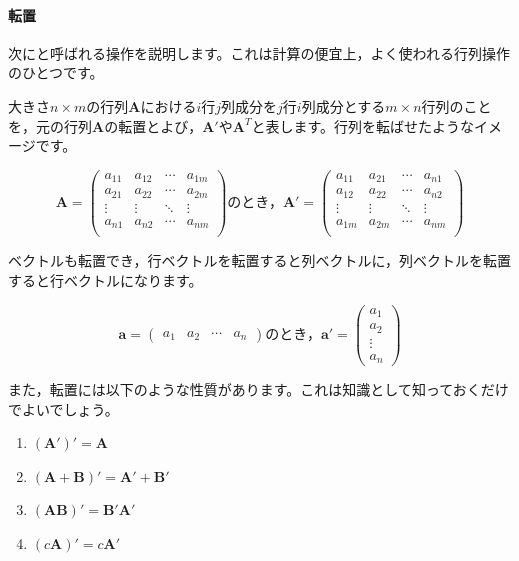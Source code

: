 \documentclass{ltjsbook}
\begin{document}
 \paragraph{転置}
 次にと呼ばれる操作を説明します。これは計算の便宜上，よく使われる行列操作のひとつです。

大きさ$n \times m$の行列$\bm{A}$における$i$行$j$列成分を$j$行$i$列成分とする$m \times n$行列のことを，元の行列$\bm{A}$の転置とよび，$\bm{A}'$や$\bm{A}^T$と表します。行列を転ばせたようなイメージです。

\begin{equation*}
\bm{A}=
\begin{pmatrix}
a_{11} & a_{12} & \cdots & a_{1m} \\
a_{21} & a_{22} & \cdots & a_{2m} \\
\vdots & \vdots & \ddots & \vdots \\
a_{n1} & a_{n2} & \cdots & a_{nm} \\
\end{pmatrix}
\mbox{のとき，}
\bm{A}'=
\begin{pmatrix}
a_{11} & a_{21} & \cdots & a_{n1} \\
a_{12} & a_{22} & \cdots & a_{n2} \\
\vdots & \vdots & \ddots & \vdots \\
a_{1m} & a_{2m} & \cdots & a_{nm} \\
\end{pmatrix}
\end{equation*}


ベクトルも転置でき，行ベクトルを転置すると列ベクトルに，列ベクトルを転置すると行ベクトルになります。

\begin{equation*}
\bm{a} =
\begin{pmatrix}
a_1 & a_2 & \cdots & a_n
\end{pmatrix}
\mbox{のとき，}
\bm{a}'=
\begin{pmatrix}
a_1\\
a_2\\
\vdots \\
a_n
\end{pmatrix}
\end{equation*}

また，転置には以下のような性質があります。これは知識として知っておくだけでよいでしょう。
\begin{enumerate}
	\item $(\bm{A} ')' = \bm{A}$
	\item $(\bm{A} + \bm{B} )' = \bm{A}' + \bm{B}'$
	\item $(\bm{A} \bm{B})'=\bm{B}'\bm{A}'$
	\item $(c\bm{A})'=c\bm{A}'$
\end{enumerate}
\end{document}

